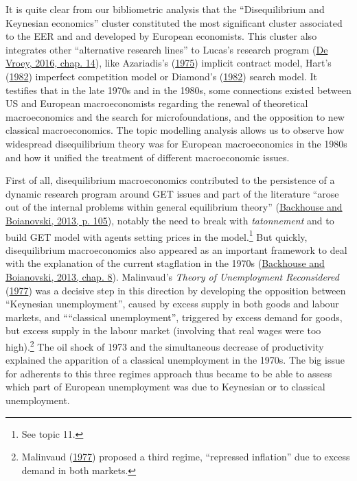 \documentclass[]{elsarticle} %
\begin{document}
It is quite clear from our bibliometric analysis that the
``Disequilibrium and Keynesian economics'' cluster constituted the most
significant cluster associated to the EER and and developed by European
economists. This cluster also integrates other ``alternative research
lines'' to Lucas's research program
(\protect\hyperlink{ref-devroey2016}{De Vroey, 2016, chap. 14}), like
Azariadis's (\protect\hyperlink{ref-azariadis1975}{1975}) implicit
contract model, Hart's (\protect\hyperlink{ref-hart1982}{1982})
imperfect competition model or Diamond's
(\protect\hyperlink{ref-diamond1982}{1982}) search model. It testifies
that in the late 1970s and in the 1980s, some connections existed
between US and European macroeconomists regarding the renewal of
theoretical macroeconomics and the search for microfoundations, and the
opposition to new classical macroeconomics. The topic modelling analysis
allows us to observe how widespread disequilibrium theory was for
European macroeconomics in the 1980s and how it unified the treatment of
different macroeconomic issues.

First of all, disequilibrium macroeconomics contributed to the
persistence of a dynamic research program around GET issues and part of
the literature ``arose out of the internal problems within general
equilibrium theory''
(\protect\hyperlink{ref-backhouseboianovski2013}{Backhouse and
Boianovski, 2013, p. 105}), notably the need to break with
\emph{tatonnement} and to build GET model with agents setting prices in
the model.\footnote{See topic 11.} But quickly, disequilibrium
macroeconomics also appeared as an important framework to deal with the
explanation of the current stagflation in the 1970s
(\protect\hyperlink{ref-backhouseboianovski2013}{Backhouse and
Boianovski, 2013, chap. 8}). Malinvaud's \emph{Theory of Unemployment
Reconsidered} (\protect\hyperlink{ref-malinvaud1977}{1977}) was a
decisive step in this direction by developing the opposition between
``Keynesian unemployment'', caused by excess supply in both goods and
labour markets, and ````classical unemployment'', triggered by excess
demand for goods, but excess supply in the labour market (involving that
real wages were too high).\footnote{Malinvaud
  (\protect\hyperlink{ref-malinvaud1977}{1977}) proposed a third regime,
  ``repressed inflation'' due to excess demand in both markets.} The oil
shock of 1973 and the simultaneous decrease of productivity explained
the apparition of a classical unemployment in the 1970s. The big issue
for adherents to this three regimes approach thus became to be able to
assess which part of European unemployment was due to Keynesian or to
classical unemployment.
\end{document}
